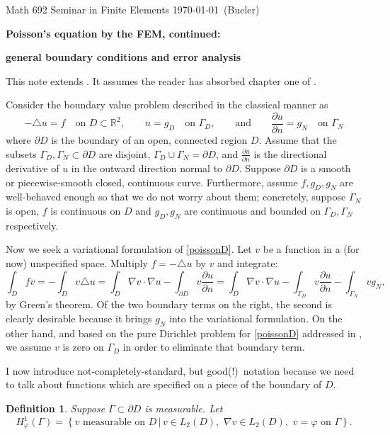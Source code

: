 \documentclass[12pt]{amsart}
\newtheorem*{defn}{Definition}
\theoremstyle{definition}
\newcommand{\ddn}[1]{\frac{\partial #1}{\partial n}}
\newcommand{\grad}{\nabla}
\newcommand{\lap}{\triangle}
\newcommand{\RR}{\mathbb{R}}
\newcommand{\vf}{\varphi}
\begin{document}
\scriptsize \noindent Math 692 Seminar in Finite Elements \hfill \today~(Bueler) 
\normalsize\bigskip

\Large\centerline{\textbf{Poisson's equation by the FEM, continued:}}
\centerline{\textbf{general boundary conditions and error analysis}}
\normalsize\bigskip\medskip

This note extends \cite{Buelerpoisson}.  It assumes the reader has absorbed  chapter one of \cite{Johnson}.
\thispagestyle{empty}

Consider the boundary value problem described in the classical manner as
\begin{equation}\label{poissonD}
-\lap u = f \quad \text{on } D\subset \RR^2, \qquad u=g_D \quad \text{on } \Gamma_D, \qquad \text{and} \qquad \ddn{u}=g_N \quad \text{on } \Gamma_N
\end{equation}
where $\partial D$ is the boundary of an open, connected region $D$.  Assume that the subsets $\Gamma_D, \Gamma_N \subset \partial D$ are disjoint, $\Gamma_D\cup \Gamma_N =\partial D$, and $\ddn{u}$ is the directional derivative of $u$ in the outward direction normal to $\partial D$.  Suppose $\partial D$ is a smooth or piecewise-smooth closed, continuous curve.  Furthermore, assume $f,g_D,g_N$ are well-behaved enough so that we do not worry about them; concretely, suppose $\Gamma_N$ is open, $f$ is continuous on $D$ and $g_D,g_N$ are continuous and bounded on $\Gamma_D,\Gamma_N$ respectively.

Now we seek a variational formulation of \eqref{poissonD}.  Let $v$ be a function in a (for now) unspecified space.  Multiply $f=-\lap u$ by $v$ and integrate:
\begin{equation*}
\int_D f v = -\int_D v \lap u = \int_D \grad v\cdot \grad u - \int_{\partial D} v \ddn{u} = \int_D \grad v\cdot \grad u - \int_{\Gamma_D} v \ddn{u} - \int_{\Gamma_N} v g_N,
\end{equation*}
by Green's theorem.  Of the two boundary terms on the right, the second is clearly desirable because it brings $g_N$ into the variational formulation.  On the other hand, and based on the pure Dirichlet problem for \eqref{poissonD} addressed in \cite{Buelerpoisson}, we assume $v$ is zero on $\Gamma_D$ in order to eliminate that boundary term.

I now introduce not-completely-standard, but good(!)~notation because we need to talk about functions which are specified on a piece of the boundary of $D$.

\begin{defn}  Suppose $\Gamma\subset \partial D$ is measurable.  Let \emph{
    $$H_\vf^1(\Gamma) = \left\{v \text{ measurable on } D\, \big|\, v\in L_2(D), \,\, \grad v\in L_2(D), \,\, v=\vf \text{ on } \Gamma\right\}.$$ }
\end{defn}
\end{document}

